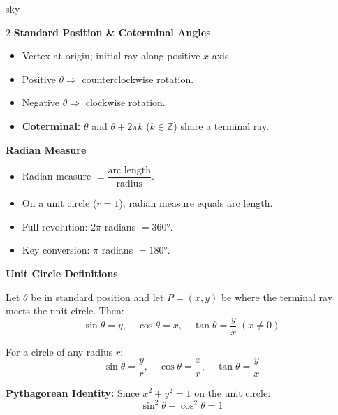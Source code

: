 \documentclass[10pt]{article}
\begin{document}
\vspace{6pt}

\begin{skillbox}{sky}
  \begin{multicols}{2}
    \textbf{Standard Position \& Coterminal Angles}
    \begin{itemize}[leftmargin=1.2em, itemsep=2pt]
      \item Vertex at origin; initial ray along positive $x$-axis.
      \item Positive $\theta \Rightarrow$ counterclockwise rotation.
      \item Negative $\theta \Rightarrow$ clockwise rotation.
      \item \textbf{Coterminal:} $\theta$ and $\theta + 2\pi k$ ($k\in\mathbb{Z}$) share a terminal ray.
    \end{itemize}

    \medskip
    \textbf{Radian Measure}
    \begin{itemize}[leftmargin=1.2em, itemsep=2pt]
      \item Radian measure $= \dfrac{\text{arc length}}{\text{radius}}$.
      \item On a unit circle ($r=1$), radian measure equals arc length.
      \item Full revolution: $2\pi$ radians $= 360°$.
      \item Key conversion: $\pi$ radians $= 180°$.
    \end{itemize}

    \columnbreak

    \textbf{Unit Circle Definitions}

    Let $\theta$ be in standard position and let $P = (x,y)$ be where the terminal ray meets the
    unit circle. Then:
    \[
      \sin\theta = y, \quad \cos\theta = x, \quad \tan\theta = \frac{y}{x} \; (x\ne 0)
    \]

    For a circle of any radius $r$:
    \[
      \sin\theta = \frac{y}{r}, \quad \cos\theta = \frac{x}{r}, \quad \tan\theta = \frac{y}{x}
    \]

    \medskip
    \textbf{Pythagorean Identity:} Since $x^2+y^2=1$ on the unit circle:
    \[
      \sin^2\theta + \cos^2\theta = 1
    \]
  \end{multicols}
\end{skillbox}
\end{document}
